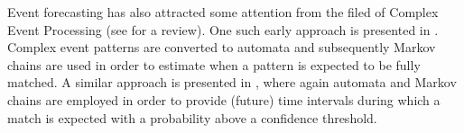 \par Event forecasting has also attracted some attention from the filed of Complex Event Processing (see \cite{Cugola:2012:PFI:2187671.2187677} for a review).
One such early approach is presented in \cite{muthusamy_predictive_2010}.
Complex event patterns are converted to automata and subsequently
Markov chains are used in order to estimate when a pattern is expected to be fully matched.
A similar approach is presented in \cite{alevizos2017event},
where again automata and Markov chains are employed in order to provide (future) time intervals during which a match is expected with a probability above a confidence threshold. 